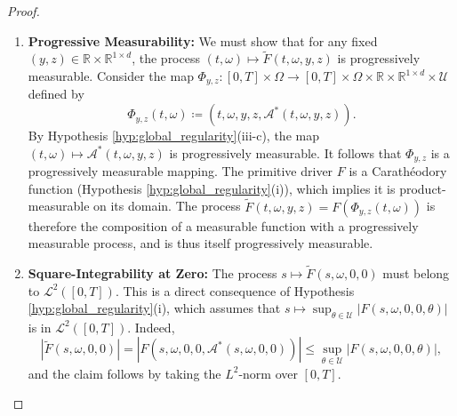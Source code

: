 \documentclass[12pt, letterpaper]{amsart}
\newcommand{\Thetacal}{\mathcal{A}}
\newcommand{\Ucal}{\mathcal{U}}
\newcommand{\Lcalp}[1]{\mathcal{L}^{#1}}
\newcommand{\R}{\mathbb{R}}
\theoremstyle{plain}
\theoremstyle{definition}
\theoremstyle{remark}
\numberwithin{equation}{section} %
\begin{document}
\begin{proof}
\begin{enumerate}[label=(\alph*)]
    \item \textbf{Progressive Measurability:} We must show that for any fixed $(y,z) \in \R \times \R^{1\times d}$, the process $(t,\omega) \mapsto \tilde{F}(t,\omega,y,z)$ is progressively measurable. Consider the map $\Phi_{y,z}: [0,T]\times\Omega \to [0,T]\times\Omega\times\R\times\R^{1\times d}\times\Ucal$ defined by
    \[ \Phi_{y,z}(t,\omega) \coloneqq (t, \omega, y, z, \Thetacal^*(t,\omega,y,z)). \]
    By Hypothesis \ref{hyp:global_regularity}(iii-c), the map $(t,\omega) \mapsto \Thetacal^*(t,\omega,y,z)$ is progressively measurable. It follows that $\Phi_{y,z}$ is a progressively measurable mapping. The primitive driver $F$ is a Carathéodory function (Hypothesis \ref{hyp:global_regularity}(i)), which implies it is product-measurable on its domain. The process $\tilde{F}(t,\omega,y,z) = F(\Phi_{y,z}(t,\omega))$ is therefore the composition of a measurable function with a progressively measurable process, and is thus itself progressively measurable.

    \item \textbf{Square-Integrability at Zero:} The process $s \mapsto \tilde{F}(s,\omega,0,0)$ must belong to $\Lcalp{2}([0,T])$. This is a direct consequence of Hypothesis \ref{hyp:global_regularity}(i), which assumes that $s \mapsto \sup_{\theta \in \Ucal} |F(s, \omega, 0, 0, \theta)|$ is in $\Lcalp{2}([0,T])$. Indeed,
    \[ |\tilde{F}(s,\omega,0,0)| = |F(s, \omega, 0, 0, \Thetacal^*(s,\omega,0,0))| \le \sup_{\theta \in \Ucal} |F(s, \omega, 0, 0, \theta)|, \]
    and the claim follows by taking the $L^2$-norm over $[0,T]$.


\end{enumerate}
\end{proof}
\end{document}
